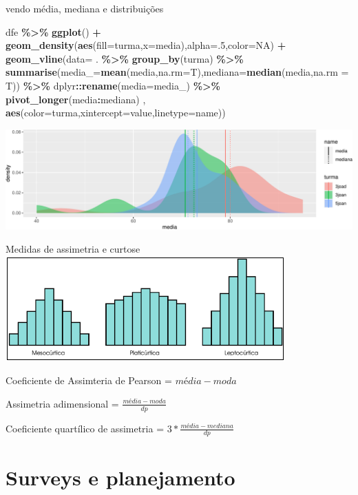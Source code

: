 \documentclass[
  9pt,
  ignorenonframetext,
  aspectratio=169]{beamer}
\newenvironment{Shaded}{\begin{snugshade}}{\end{snugshade}}
\newcommand{\DataTypeTok}[1]{\textcolor[rgb]{0.13,0.29,0.53}{#1}}
\newcommand{\DecValTok}[1]{\textcolor[rgb]{0.00,0.00,0.81}{#1}}
\newcommand{\KeywordTok}[1]{\textcolor[rgb]{0.13,0.29,0.53}{\textbf{#1}}}
\newcommand{\NormalTok}[1]{#1}
\newcommand{\OperatorTok}[1]{\textcolor[rgb]{0.81,0.36,0.00}{\textbf{#1}}}
\newcommand{\OtherTok}[1]{\textcolor[rgb]{0.56,0.35,0.01}{#1}}
\newcommand{\StringTok}[1]{\textcolor[rgb]{0.31,0.60,0.02}{#1}}
\begin{document}
\begin{frame}[fragile]{vendo média, mediana e distribuições}
\protect\hypertarget{vendo-muxe9dia-mediana-e-distribuiuxe7uxf5es-1}{}
\begin{Shaded}
\begin{Highlighting}[]
\NormalTok{dfe }\OperatorTok{\%\textgreater{}\%}\StringTok{ }\KeywordTok{ggplot}\NormalTok{() }\OperatorTok{+}
\StringTok{  }\KeywordTok{geom\_density}\NormalTok{(}\KeywordTok{aes}\NormalTok{(}\DataTypeTok{fill=}\NormalTok{turma,}\DataTypeTok{x=}\NormalTok{media),}\DataTypeTok{alpha=}\NormalTok{.}\DecValTok{5}\NormalTok{,}\DataTypeTok{color=}\OtherTok{NA}\NormalTok{) }\OperatorTok{+}
\StringTok{  }\KeywordTok{geom\_vline}\NormalTok{(}\DataTypeTok{data=}\NormalTok{ . }\OperatorTok{\%\textgreater{}\%}\StringTok{ }\KeywordTok{group\_by}\NormalTok{(turma) }\OperatorTok{\%\textgreater{}\%}
\StringTok{               }\KeywordTok{summarise}\NormalTok{(}\DataTypeTok{media\_=}\KeywordTok{mean}\NormalTok{(media,}\DataTypeTok{na.rm=}\NormalTok{T),}\DataTypeTok{mediana=}\KeywordTok{median}\NormalTok{(media,}\DataTypeTok{na.rm =}\NormalTok{ T)) }\OperatorTok{\%\textgreater{}\%}\StringTok{ }
\StringTok{               }\NormalTok{dplyr}\OperatorTok{::}\KeywordTok{rename}\NormalTok{(}\DataTypeTok{media=}\NormalTok{media\_) }\OperatorTok{\%\textgreater{}\%}\StringTok{ }\KeywordTok{pivot\_longer}\NormalTok{(media}\OperatorTok{:}\NormalTok{mediana) ,}
             \KeywordTok{aes}\NormalTok{(}\DataTypeTok{color=}\NormalTok{turma,}\DataTypeTok{xintercept=}\NormalTok{value,}\DataTypeTok{linetype=}\NormalTok{name))}
\end{Highlighting}
\end{Shaded}

\includegraphics{aula_08_files/figure-beamer/unnamed-chunk-11-1.pdf}
\end{frame}

\begin{frame}{Medidas de assimetria e curtose}
\protect\hypertarget{medidas-de-assimetria-e-curtose}{}
\includegraphics{imgs/curtose.png}

Coeficiente de Assimteria de Pearson = \(média - moda\)

Assimetria adimensional = \(\frac{média - moda}{dp}\)

Coeficiente quartílico de assimetria = \(3*\frac{média-mediana}{dp}\)
\end{frame}

\hypertarget{surveys-e-planejamento}{%
\section{Surveys e planejamento}\label{surveys-e-planejamento}}
\end{document}
